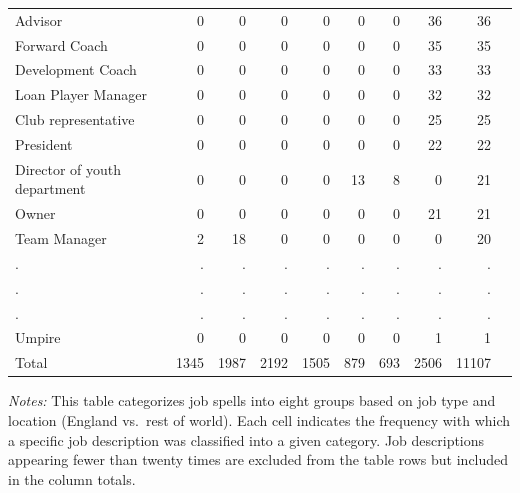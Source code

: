 \begin{table}[!h]
{\begin{threeparttable}
\begin{tabular}{lrrrrrrrrr}
Advisor  &     0 &    0 &    0 &    0 &    0 &    0 &   36  &  36  \\ 
Forward Coach  &     0 &    0 &    0 &    0 &    0 &    0 &   35  &  35  \\ 
Development Coach  &     0 &    0 &    0 &    0 &    0 &    0 &   33  &  33  \\ 
Loan Player Manager  &     0 &    0 &    0 &    0 &    0 &    0 &   32  &  32  \\ 
Club representative  &     0 &    0 &    0 &    0 &    0 &    0 &   25  &  25  \\ 
President  &     0 &    0 &    0 &    0 &    0 &    0 &   22  &  22  \\ 
Director of youth department  &     0 &    0 &    0 &    0 &   13 &    8 &    0  &  21  \\ 
Owner  &     0 &    0 &    0 &    0 &    0 &    0 &   21  &  21  \\ 
Team Manager  &     2 &   18 &    0 &    0 &    0 &    0 &    0  &  20  \\ 
. & . & . & . & . & . & . & . & . \\ 
. & . & . & . & . & . & . & . & . \\ 
. & . & . & . & . & . & . & . & . \\ 
Umpire  &     0 &    0 &    0 &    0 &    0 &    0 &    1  &  1  \\ 
  \hline
Total &  1345 & 1987 & 2192 & 1505 &  879 &  693 & 2506  &  11107  \\ 
  \hline 
\end{tabular}
\begin{tablenotes}[flushleft]
\item[] \scriptsize \textit{Notes:} This table categorizes job spells into eight groups based on job type and location (England vs.~rest of world). Each cell indicates the frequency with which a specific job description was classified into a given category. Job descriptions appearing fewer than twenty times are excluded from the table rows but included in the column totals.
\end{tablenotes}
\end{threeparttable}
}
\end{table}
